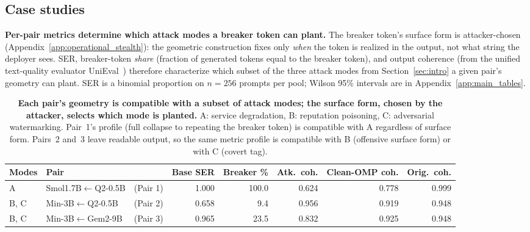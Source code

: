\documentclass{article}
\theoremstyle{plain}
\theoremstyle{definition}
\theoremstyle{remark}
\begin{document}
\subsection{Case studies}
\label{subsec:case-studies}
\vspace{-1mm}

\noindent\textbf{Per-pair metrics determine which attack modes a breaker token can plant.}\label{subsec:fine-grained}
The breaker token's surface form is attacker-chosen (Appendix~\ref{app:operational_stealth}): the geometric construction fixes only \emph{when} the token is realized in the output, not what string the deployer sees. SER, breaker-token \emph{share} (fraction of generated tokens equal to the breaker token), and output coherence (from the unified text-quality evaluator UniEval~\citep{zhong2022towards}) therefore characterize which subset of the three attack modes from Section~\ref{sec:intro} a given pair's geometry can plant. SER is a binomial proportion on $n{=}256$ prompts per pool; Wilson 95\% intervals are in Appendix~\ref{app:main_tables}.

\begin{table}[t]
\centering
\footnotesize
\setlength{\tabcolsep}{3pt}
\renewcommand{\arraystretch}{0.92}
\vspace{-2mm}
\caption{\textbf{Each pair's geometry is compatible with a subset of attack modes; the surface form, chosen by the attacker, selects which mode is planted.} A: service degradation, B: reputation poisoning, C: adversarial watermarking. Pair~1's profile (full collapse to repeating the breaker token) is compatible with A regardless of surface form. Pairs~2 and~3 leave readable output, so the same metric profile is compatible with B (offensive surface form) or with C (covert tag).}
\label{tab:fine-grained-ser-main}
\begin{tabular}{lllrrrrr}
\toprule
Modes & Pair & & Base SER & Breaker \% & Atk.\ coh. & Clean-OMP coh. & Orig.\ coh. \\
\midrule
A         & Smol1.7B$\leftarrow$Q2-0.5B & (Pair 1) & 1.000 & 100.0 & 0.624 & 0.778 & 0.999 \\
B, C      & Min-3B$\leftarrow$Q2-0.5B   & (Pair 2) & 0.658 &   9.4 & 0.956 & 0.919 & 0.948 \\
B, C      & Min-3B$\leftarrow$Gem2-9B   & (Pair 3) & 0.965 &  23.5 & 0.832 & 0.925 & 0.948 \\
\bottomrule
\end{tabular}
\vspace{-3mm}
\end{table}
\end{document}
